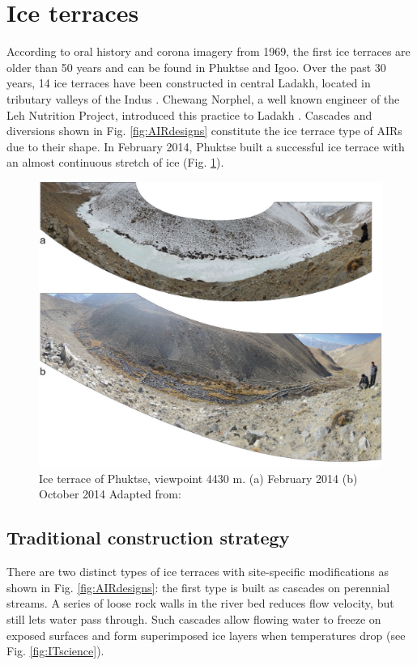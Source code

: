 \section{Ice terraces}

According to oral history and corona imagery from 1969, the first ice terraces are older than 50 years and can
be found in Phuktse and Igoo. Over the past 30 years, 14 ice terraces have been constructed in central Ladakh,
located in tributary valleys of the Indus \citep{norphelArtificialGlacierHigh2009,
nusserSociohydrologyArtificialGlaciers2019}. Chewang Norphel, a well known engineer of the Leh Nutrition
Project, introduced this practice to Ladakh \citep{vinceGlacierMan2009}. Cascades and diversions shown in Fig.
\ref{fig:AIRdesigns} constitute the ice terrace type of AIRs due to their shape. In February 2014, Phuktse built
a successful ice terrace with an almost continuous stretch of ice (Fig. \ref{fig:ITexample}).

\begin{figure}[htb]
\centering
\includegraphics[width=12cm]{figs/IT_example.png}
\caption{Ice terrace of Phuktse, viewpoint 4430 m. (a) February 2014 (b) October 2014 Adapted from: \cite{nusserSociohydrologyArtificialGlaciers2019}}
\label{fig:ITexample}
\end{figure}

\subsection{Traditional construction strategy}

There are two distinct types of ice terraces with site-specific modifications as shown in Fig.
\ref{fig:AIRdesigns}: the first type is built as cascades on perennial streams. A series of loose rock walls in
the river bed reduces flow velocity, but still lets water pass through. Such cascades allow flowing water to
freeze on exposed surfaces and form superimposed ice layers when temperatures drop (see Fig.
\ref{fig:ITscience}).

